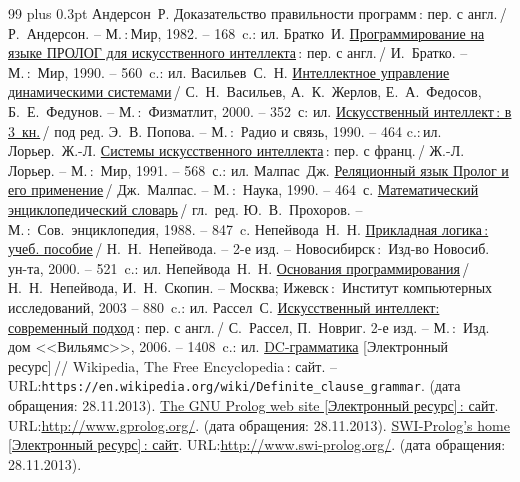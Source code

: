 \documentclass[12pt, openany, twoside, final]{extbook} %
\def\emphbib#1{#1}
\begin{document}
\begin{thebibliography}{99}\itemsep1pt \parskip 0pt plus 0.3pt
 Андерсон~Р. \emphbib{Доказательство правильности программ}\,{}: пер. с англ.\,{}/ Р.~Андерсон. -- М.\,:\,Мир, 1982. -- 168~c.: ил.
 Братко~И. \emphbib{\href{http://royallib.ru/book/bratko_ivan/programmirovanie_na_yazike_prolog_dlya_iskusstvennogo_intellekta.html}{Программирование на языке ПРОЛОГ для искусственного интеллекта}}\,{}: пер. с англ.\,/ И.~Братко. -- М.\,:~Мир, 1990. -- 560~c.: ил.
 Васильев~С.~Н. \emphbib{\href{http://bookfi.org/book/616050}{Интеллектное управление динамическими системами}}\,{}/ С.~Н.~Васильев, А.~К.~Жерлов, Е.~А.~Федосов, Б.~Е.~Федунов. -- М.\,:~Физматлит, 2000. -- 352~с: ил.
 \emphbib{\href{http://aihandbook.intsys.org.ru/index.php/intro/ai-handbook}{Искусственный интеллект\,{}: в 3~кн.}}\,{}/ под ред. Э.~В. Попова. -- М.\,:~Радио и связь, 1990. -- 464 c.:\,{}ил.
 Лорьер.~Ж.-Л.  \emphbib{\href{http://publ.lib.ru/ARCHIVES/L/LOR'ER_Jan_Lui/_Lor'er_J.L..html}{Системы искусственного интеллекта}\,{}: пер. с франц.}\,{}/ Ж.-Л. Лорьер. -- М.\,:~Мир, 1991. -- 568~с.: ил.
 Малпас~Дж. \emphbib{\href{http://padaread.com/?book=40731&pg=1}{Реляционный язык Пролог и его применение}}\,{}/ Дж.~Малпас. -- М.\,:~Наука, 1990. -- 464~с.
 \emphbib{\href{https://app.box.com/shared/793ukgvblxmj0hh6btw4}{Математический энциклопедический словарь}}\,{}/ гл.~ред. Ю.~В.~Прохоров. -- М.\,:~Сов.~энциклопедия, 1988. -- 847~c.
 Непейвода~Н.~Н. \emphbib{\href{http://www.logic-books.info/taxonomy/term/215}{Прикладная логика\,{}: учеб. пособие}}\,{}/ Н.~Н.~Непейвода. -- 2-е изд. -- Новосибирск\,{}:~Изд-во Новосиб. ун-та, 2000. -- 521~c.: ил.
 Непейвода~Н.~Н.  \emphbib{\href{http://philosophy.ru/library/logic_math/library/nepeivoda_prog.pdf}{Основания программирования}}\,{}/ Н.~Н.~Непейвода, И.~Н.~Скопин. -- Москва; Ижевск\,{}:~Институт компьютерных исследований, 2003 -- 880~c.: ил.
 Рассел~С. \href{http://www.aiportal.ru/downloads/books/ai-modern-approach-2-edition-by-rassel-norvig.html}{Искусственный интеллект: современный подход}\,{}: пер. с англ.\,{}/ С.~Рассел, П.~Новриг. 2-е изд. -- М.\,:~Изд. дом <<Вильямс>>, 2006. -- 1408~c.: ил.
 \emphbib{\href{https://en.wikipedia.org/wiki/Definite_clause_grammar}{DC-грамматика}} [Электронный ресурс]\,{}// Wikipedia, The Free Encyclopedia\,{}: сайт. -- URL:\texttt{https://en.wikipedia.org/wiki/Definite\_clause\linebreak\_grammar}. (дата обращения: 28.11.2013).
 \emphbib{\href{http://www.gprolog.org/}{The GNU Prolog web site [Электронный ресурс]\,{}: сайт}}. URL:\url{http://www.gprolog.org/}. (дата обращения: 28.11.2013).
 \emphbib{\href{http://www.swi-prolog.org/}{SWI-Prolog's home [Электронный ресурс]\,{}: сайт}}. URL:\url{http://www.swi-prolog.org/}. (дата обращения: 28.11.2013).
\end{thebibliography}
\label{lastpage}
\newpage
\thispagestyle{empty}
\mbox{}
\end{document}
